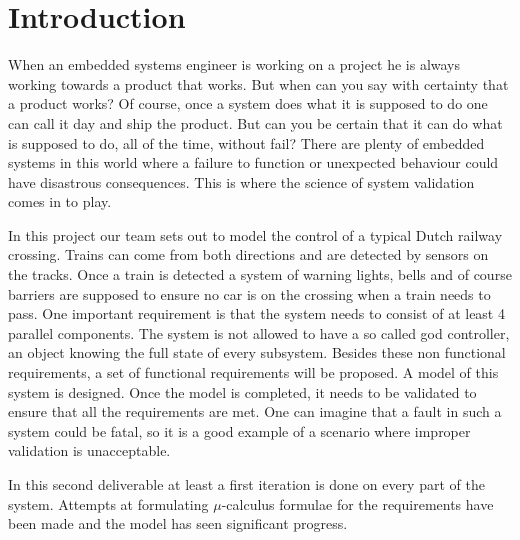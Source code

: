 \documentclass[final]{report}
\begin{document}
\chapter{Introduction}
When an embedded systems engineer is working on a project he is always working towards a product that works.
But when can you say with certainty that a product works? Of course, once a system does what it is supposed to do one can call it day and ship the product.
But can you be certain that it can do what is supposed to do, all of the time, without fail? There are plenty of embedded systems in this world where a failure to function or unexpected behaviour could have disastrous consequences.
This is where the science of system validation comes in to play.

In this project our team sets out to model the control of a typical Dutch railway crossing.
Trains can come from both directions and are detected by sensors on the tracks.
Once a train is detected a system of warning lights, bells and of course barriers are supposed to ensure no car is on the crossing when a train needs to pass.
One important requirement is that the system needs to consist of at least 4 parallel components.
The system is not allowed to have a so called god controller, an object knowing the full state of every subsystem.
Besides these non functional requirements, a set of functional requirements will be proposed.
A model of this system is designed.
Once the model is completed, it needs to be validated to ensure that all the requirements are met.
One can imagine that a fault in such a system could be fatal, so it is a good example of a scenario where improper validation is unacceptable.

In this second deliverable at least a first iteration is done on every part of the system.
Attempts at formulating $\mu$-calculus formulae for the requirements have been made and the model has seen significant progress.
\end{document}
